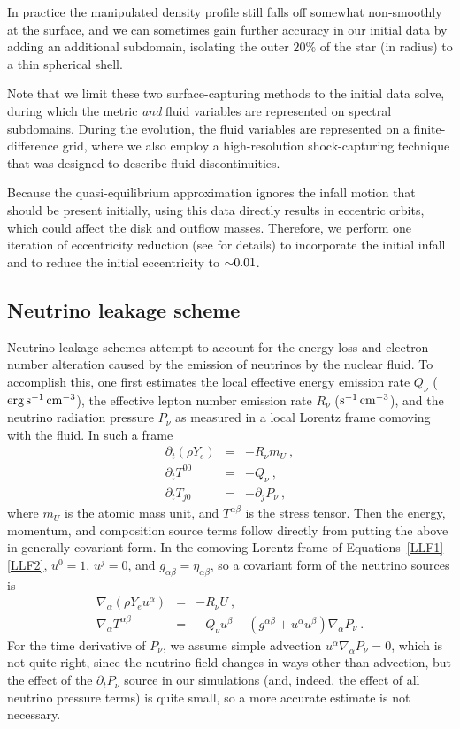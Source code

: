 In practice the manipulated density profile still falls off somewhat
non-smoothly at the surface, and we can sometimes gain further
accuracy in our initial data by adding an additional subdomain, isolating
the outer $20\%$ of the star (in radius) to a thin spherical shell.

Note that we limit these two surface-capturing methods to the initial data solve,
during which the metric \emph{and} fluid variables are represented on spectral subdomains.
During the evolution, the fluid variables are represented on a finite-difference
grid, where we also employ a high-resolution shock-capturing technique that
was designed to describe fluid discontinuities.

Because the quasi-equilibrium approximation ignores the infall motion
that should be present initially, using this data directly results
in eccentric orbits, which could affect the disk and outflow masses.
Therefore, we perform one iteration of eccentricity reduction (see
\citealt{Pfeiffer-Brown-etal:2007} for details) to incorporate the initial
infall and to reduce the initial eccentricity to $\mathord{\sim}0.01$.

\subsection{Neutrino leakage scheme}
\label{sec:leakage}
Neutrino leakage schemes attempt to account for
the energy loss and electron number alteration caused
by the emission of neutrinos by the nuclear fluid.  To accomplish this, one
first estimates the local effective energy emission rate
$Q_{\nu}$ ($\rm erg\,s^{-1}\,cm^{-3}$), the effective lepton number
emission rate $R_{\nu}$ ($\rm s^{-1}\,cm^{-3}$), and the neutrino
radiation pressure $P_{\nu}$ as measured in a local
Lorentz frame comoving with the fluid.  In such a frame
\begin{eqnarray}
\label{LLF1}
\partial_t (\rho Y_e) &=& -R_{\nu}m_U\ , \\
\partial_t T^{00} &=& -Q_{\nu}\ , \\
\label{LLF2}
\partial_t T_{j0} &=& -\partial_j P_{\nu}\ ,
\end{eqnarray}
where $m_U$ is the atomic mass unit,
and $T^{\alpha\beta}$ is the stress tensor.
Then the energy,
momentum, and composition source terms
follow directly from putting the above in generally
covariant form.  In the comoving Lorentz frame of
Equations~\ref{LLF1}-\ref{LLF2}, $u^0=1$, $u^j=0$,
and $g_{\alpha\beta}=\eta_{\alpha\beta}$,
so a covariant form of the neutrino sources is
\begin{eqnarray}
  \nabla_{\alpha}(\rho Y_e u^{\alpha}) &=& -R_{\nu}U\ , \\
  \nabla_{\alpha}T^{\alpha\beta} &=& -Q_{\nu}u^{\beta}
  - (g^{\alpha\beta}+u^{\alpha}u^{\beta})\nabla_{\alpha}P_{\nu}\ .
\end{eqnarray}
For the time derivative of $P_{\nu}$, we assume simple
advection $u^{\alpha}\nabla_{\alpha}P_{\nu}=0$, which is
not quite right, since the neutrino field changes in ways other
than advection, but the effect of the $\partial_tP_{\nu}$
source in our simulations (and, indeed, the effect of all neutrino
pressure terms) is quite small, so a more accurate
estimate is not necessary.

